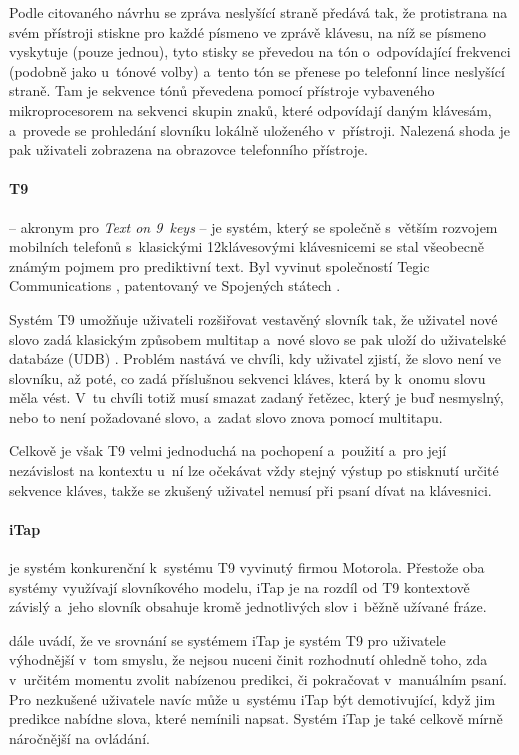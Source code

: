 \documentclass[a4paper,11pt,openany]{book} %
\begin{document}
Podle citovaného návrhu se zpráva neslyšící straně předává tak, že protistrana na svém přístroji stiskne pro každé písmeno ve zprávě klávesu, na níž se písmeno vyskytuje (pouze jednou), tyto stisky se převedou na tón o~odpovídající frekvenci (podobně jako u~tónové volby) a~tento tón se přenese po telefonní lince neslyšící straně. Tam je sekvence tónů převedena pomocí přístroje vybaveného mikroprocesorem na sekvenci skupin znaků, které odpovídají daným klávesám, a~provede se prohledání slovníku lokálně uloženého v~přístroji. Nalezená shoda je pak uživateli zobrazena na obrazovce telefonního přístroje.

\paragraph{T9}\label{t9}
 -- akronym pro {\it Text on 9~keys} -- je systém, který se společně s~větším rozvojem mobilních telefonů s~klasickými 12klávesovými klávesnicemi se stal všeobecně známým pojmem pro prediktivní text. Byl vyvinut společností Tegic Communications \parencite{nuancecommunications2007}, patentovaný ve Spojených státech \parencite{grover1998reduced}. 

Systém T9 umožňuje uživateli rozšiřovat vestavěný slovník tak, že uživatel nové slovo zadá klasickým způsobem multitap a~nové slovo se pak uloží do uživatelské databáze (UDB) \parencite{t9about}. %
Problém nastává ve chvíli, kdy uživatel zjistí, že slovo není ve slovníku, až poté, co zadá příslušnou sekvenci kláves, která by k~onomu slovu měla vést. V~tu chvíli totiž musí smazat zadaný řetězec, který je buď nesmyslný, nebo to není požadované slovo, a~zadat slovo znova pomocí multitapu.

Celkově je však T9 velmi jednoduchá na pochopení a~použití a~pro její nezávislost na kontextu u~ní lze očekávat vždy stejný výstup po stisknutí určité sekvence kláves, takže se zkušený uživatel nemusí při psaní dívat na klávesnici. \parencite{davidmackay}

\paragraph{iTap}
je systém konkurenční k~systému T9 vyvinutý firmou Motorola. Přestože oba systémy využívají slovníkového modelu, iTap je na rozdíl od T9 kontextově závislý a~jeho slovník obsahuje kromě jednotlivých slov i~běžně užívané fráze. 

\parencite{davidmackay} dále uvádí, že ve srovnání se systémem iTap je systém T9 pro uživatele výhodnější v~tom smyslu, že nejsou nuceni činit rozhodnutí ohledně toho, zda v~určitém momentu zvolit nabízenou predikci, či pokračovat v~manuálním psaní. Pro nezkušené uživatele navíc může u~systému iTap být demotivující, když jim predikce nabídne slova, které nemínili napsat. Systém iTap je také celkově mírně náročnější na ovládání.
\end{document}
